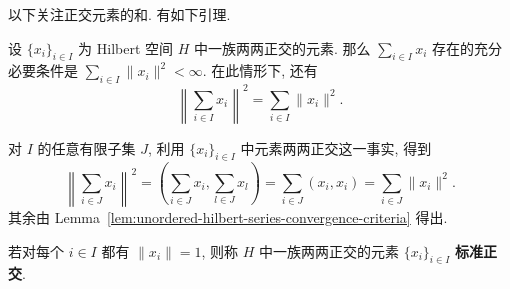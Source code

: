 以下关注正交元素的和. 有如下引理.

\begin{Lemma}
\label{lem:orthogonal-series-summability}
设 $\{x_i\}_{i\in I}$ 为 Hilbert 空间 $H$ 中一族两两正交的元素. 那么 $\sum_{i\in I}x_i$ 存在的充分必要条件是 $\sum_{i\in I}\|x_i\|^2<\infty$. 在此情形下, 还有
\begin{equation}\label{eq:orthogonal-series-pythagorean-norm}
\left\|\sum_{i\in I}x_i\right\|^2=\sum_{i\in I}\|x_i\|^2.
\end{equation}

\end{Lemma}

\begin{Proof}
对 $I$ 的任意有限子集 $J$, 利用 $\{x_i\}_{i\in I}$ 中元素两两正交这一事实, 得到
\begin{equation}\label{eq:finite-orthogonal-sum-norm-calculation}
\left\|\sum_{i\in J}x_i\right\|^2=\left(\sum_{i\in J}x_i,\sum_{l\in J}x_l\right)=\sum_{i\in J}(x_i,x_i)=\sum_{i\in J}\|x_i\|^2.
\end{equation}
其余由 Lemma~\ref{lem:unordered-hilbert-series-convergence-criteria} 得出.
\end{Proof}

\begin{Definition}
\label{def:orthonormal-family}
若对每个 $i\in I$ 都有 $\|x_i\|=1$, 则称 $H$ 中一族两两正交的元素 $\{x_i\}_{i\in I}$ \textbf{标准正交}.
\end{Definition}
